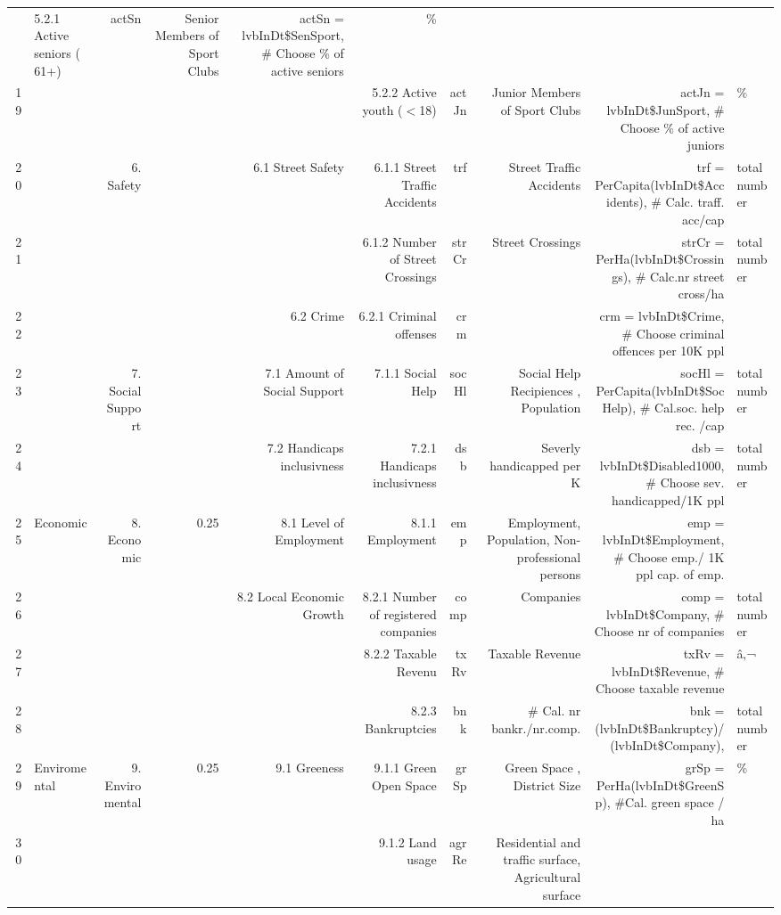 \begin{landscape}
\begin{table}[ht]
{\begin{tabular}{rlrrrrrrr}
 & 5.2.1 Active seniors ( 61+) & actSn & Senior Members of Sport Clubs & actSn = lvbInDt\$SenSport,  \# Choose \% of active seniors & \% \\ 
  19 &  &  &  &  & 5.2.2 Active youth ($<$18) & actJn & Junior Members of Sport Clubs & actJn = lvbInDt\$JunSport,  \# Choose \% of active juniors & \% \\ 
  20 &  & 6. Safety &  & 6.1 Street Safety
 & 6.1.1 Street Traffic Accidents & trf   & Street Traffic Accidents & trf   = PerCapita(lvbInDt\$Accidents),  \# Calc. traff. acc/cap & total number \\ 
  21 &  &  &  &  & 6.1.2 Number of Street Crossings  & strCr & Street Crossings & strCr = PerHa(lvbInDt\$Crossings),  \# Calc.nr street cross/ha & total number \\ 
  22 &  &  &  & 6.2 Crime & 6.2.1 Criminal offenses  & crm &  & crm   = lvbInDt\$Crime,  \# Choose criminal offences per 10K ppl &  \\ 
  23 &  & 7. Social Support &  & 7.1  Amount of Social Support & 7.1.1 Social Help & socHl & Social Help Recipiences , Population & socHl = PerCapita(lvbInDt\$SocHelp),  \# Cal.soc. help rec. /cap & total number \\ 
  24 &  &  &  & 7.2 Handicaps inclusivness  & 7.2.1 Handicaps inclusivness   & dsb & Severly handicapped per K & dsb   = lvbInDt\$Disabled1000, \# Choose sev. handicapped/1K ppl & total number \\ 
  25 & Economic & 8. Economic & 0.25 & 8.1  Level of Employment  & 8.1.1 Employment  & emp & Employment, Population, Non-professional persons  & emp   = lvbInDt\$Employment,  \# Choose emp./ 1K ppl cap. of emp. &  \\ 
  26 &  &  &  & 8.2 Local Economic Growth & 8.2.1 Number of registered companies  & comp & Companies & comp  = lvbInDt\$Company,  \# Choose nr of companies & total number \\ 
  27 &  &  &  &  & 8.2.2 Taxable Revenu & txRv & Taxable Revenue & txRv  = lvbInDt\$Revenue,  \# Choose taxable revenue & â‚¬ \\ 
  28 &  &  &  &  & 8.2.3 Bankruptcies & bnk & \# Cal. nr bankr./nr.comp. & bnk   = (lvbInDt\$Bankruptcy)/(lvbInDt\$Company), & total number \\ 
  29 & Enviromental & 9. Enviromental  & 0.25 & 9.1 Greeness & 9.1.1 Green Open Space  & grSp & Green Space , District Size & grSp  = PerHa(lvbInDt\$GreenSp),  \#Cal. green space / ha & \% \\ 
  30 &  &  &  &  & 9.1.2 Land usage  & agrRe & Residential and traffic surface, Agricultural surface


\end{tabular}}
\end{table}
\end{landscape}

